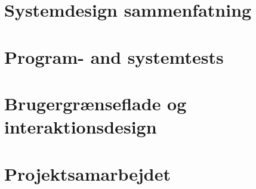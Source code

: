 \documentclass[11pt,a4paper]{report}
\begin{document}
\section{Systemdesign sammenfatning}\label{sec:Systemdesign_sammenfatning}

\section{Program- and systemtests}\label{sec:Program_systemtests}

\section{Brugergrænseflade og interaktionsdesign}

\section{Projektsamarbejdet}
\end{document}
